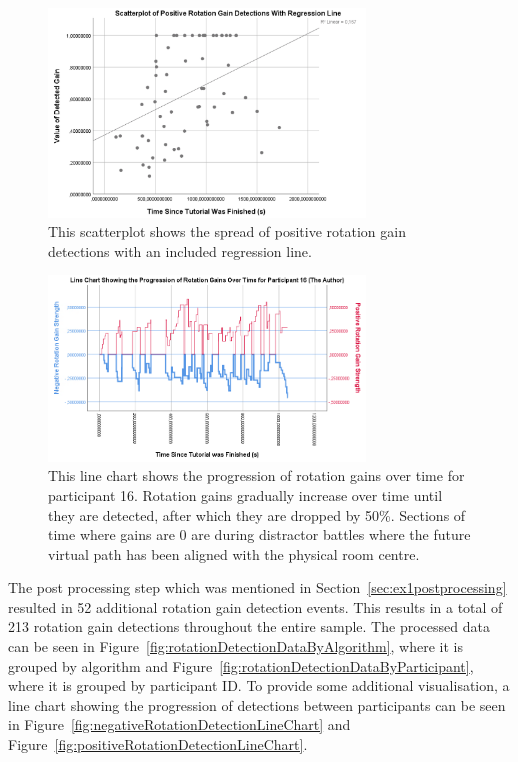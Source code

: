 \begin{figure}[tbph]
    \centering
    \includegraphics[width=0.75\textwidth]{figures/graphs/PosRotDetectionsRegLine.png}
    \caption[Scatterplot For Positive  Rotation Gain Detections Including Regression Line]{This scatterplot shows the spread of positive rotation gain detections with an included regression line.}
    \label{fig:posRotRegLine}
\end{figure}

\begin{figure}[tbph]
    \centering
    \includegraphics[width=0.75\textwidth]{figures/graphs/rotationGainProgressionAuthor.png}
    \caption[Line Chart Showing the Progression of Rotation Gains for Participant 16]{This line chart shows the progression of rotation gains over time for participant 16. Rotation gains gradually increase over time until they are detected, after which they are dropped by 50\%. Sections of time where gains are 0 are during distractor battles where the future virtual path has been aligned with the physical room centre.}
    \label{fig:authorRotationProgression}
\end{figure}

The post processing step which was mentioned in Section~\ref{sec:ex1postprocessing} resulted in 52 additional rotation gain detection events. This results in a total of 213 rotation gain detections throughout the entire sample. The processed data can be seen in Figure~\ref{fig:rotationDetectionDataByAlgorithm}, where it is grouped by algorithm and Figure~\ref{fig:rotationDetectionDataByParticipant}, where it is grouped by participant ID. To provide some additional visualisation, a line chart showing the progression of detections between participants can be seen in Figure~\ref{fig:negativeRotationDetectionLineChart} and Figure~\ref{fig:positiveRotationDetectionLineChart}.

